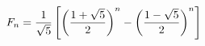 \documentclass[preview]{standalone}
\begin{document}
\begin{align*}
\special{dvisvgm:raw <g id='unique000'>}F_n=\frac{1}{\sqrt5}\left[\left(\frac{1+\sqrt5}{2}\right)^n-\left(\frac{1-\sqrt5}{2}\right)^n\right]\special{dvisvgm:raw </g>}
\end{align*}
\end{document}
